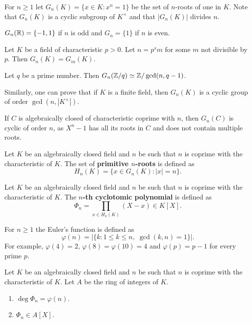 For $n\geq1$ let $G_n(K)=\{x\in K:x^n=1\}$ be the 
set of $n$-roots of one in $K$. Note that
$G_n(K)$ is a cyclic subgroup of $K^{\times}$ and that 
$|G_n(K)|$ divides $n$. 

\begin{example}
    $G_n(\mathbb{R})=\{-1,1\}$ if $n$ is odd and $G_{n}=\{1\}$ if $n$ is even.
\end{example}

\begin{exercise}
    Let $K$ be a field of characteristic $p>0$. Let $n=p^sm$ for some $m$ not divisible by $p$. 
    Then $G_n(K)=G_m(K)$. 
\end{exercise}

\begin{exercise}
    Let $q$ be a prime number. Then $G_n(\mathbb{Z}/q)\simeq\mathbb{Z}/\gcd(n,q-1)$. 
\end{exercise}

Similarly, one can prove that if $K$ is a finite field, then $G_n(K)$ is a cyclic group
of order $\gcd(n,|K^{\times}|)$. 

\begin{example}
    If $C$ is algebraically closed of characteristic coprime with $n$, 
    then $G_n(C)$ is cyclic of order $n$, as $X^n-1$ 
    has all its roots in $C$ and does not contain multiple roots. 
\end{example}

Let $K$ be an algebraically closed field and $n$ be
such that $n$ is coprime with the characteristic of $K$. The set of 
\textbf{primitive $n$-roots} is defined as 
\[
H_n(K)=\{x\in G_n(K):|x|=n\}.
\]

\begin{definition}
    Let $K$ be an algebraically closed field and $n$ be
    such that $n$ is coprime with the characteristic of $K$. The \textbf{$n$-th cyclotomic
    polynomial} is defined as 
    \[
    \Phi_n=\prod_{x\in H_n(K)}(X-x)\in K[X].
    \]
\end{definition}

For $n\geq1$ the Euler's function is defined as 
\[
\varphi(n)=|\{k:1\leq k\leq n,\;\gcd(k,n)=1\}|.
\]
For example, $\varphi(4)=2$, $\varphi(8)=\varphi(10)=4$ and $\varphi(p)=p-1$ for every prime $p$. 

\begin{proposition}
    Let $K$ be an algebraically closed field and $n$ be
    such that $n$ is coprime with the characteristic of $K$. Let $A$ be
    the ring of integers of $K$. 
    \begin{enumerate}
        \item $\deg\Phi_n=\varphi(n)$.
        \item $\Phi_n\in A[X]$.
    \end{enumerate}
\end{proposition}

